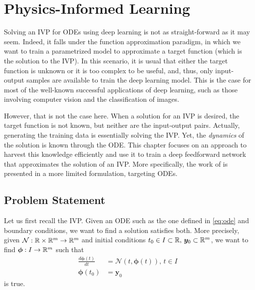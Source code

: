 \chapter{Physics-Informed Learning}\label{ch:pinn}

Solving an \gls{IVP} for \gls{ODE}s using deep learning is not as straight-forward as it may seem.
Indeed, it falls under the function approximation paradigm, in which we want to train a parametrized model to approximate a target function (which is the solution to the \gls{IVP}).
In this scenario, it is usual that either the target function is unknown or it is too complex to be useful, and, thus, only input-output samples are available to train the deep learning model.
This is the case for most of the well-known successful applications of deep learning, such as those involving computer vision and the classification of images. %

However, that is not the case here.
When a solution for an \gls{IVP} is desired, the target function is not known, but neither are the input-output pairs.
Actually, generating the training data is essentially solving the \gls{IVP}.
Yet, the \emph{dynamics} of the solution is known through the \gls{ODE}.
This chapter focuses on an approach to harvest this knowledge efficiently and use it to train a deep feedforward network that approximates the solution of an \gls{IVP}.
More specifically, the work of \textcite{Raissi2019} is presented in a more limited formulation, targeting \gls{ODE}s\footnotemark.

\section{Problem Statement}

Let us first recall the \gls{IVP}.
Given an \gls{ODE} such as the one defined in \eqref{eq:ode} and boundary conditions, we want to find a solution satisfies both.
More precisely, given $\mathcal{N}:\mathbb{R}\times \mathbb{R}^m\to \mathbb{R}^{m}$ and initial conditions $t_0\in I\subset \mathbb{R},\,\bm{y}_0\subset \mathbb{R}^{m}$, we want to find $\bm{\phi}:I\to \mathbb{R}^{m}$ such that
\begin{align*}
    \frac{d \bm{\phi}(t)}{d t} &= \mathcal{N}\left( t, \bm{\phi}(t) \right),\,t\in I \\
    \bm{\phi}(t_0) &= \bm{y}_0
\end{align*}
is true.

